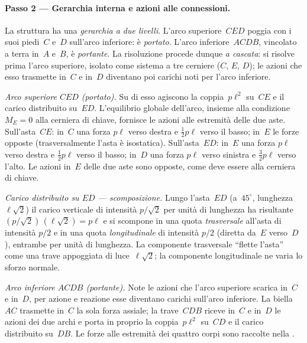 \paragraph{Passo 2 --- Gerarchia interna e azioni
	alle connessioni.}

La struttura ha una \emph{gerarchia a due livelli}.
L'arco superiore~$CED$ poggia con i suoi piedi~$C$ e~$D$
sull'arco inferiore: è \emph{portato}. L'arco
inferiore~$ACDB$, vincolato a terra in~$A$ e~$B$, è
\emph{portante}. La risoluzione procede dunque \emph{a
	cascata}: si risolve prima l'arco superiore, isolato come
sistema a tre cerniere ($C$, $E$, $D$); le azioni che esso
trasmette in~$C$ e in~$D$ diventano poi carichi noti per
l'arco inferiore.

\medskip
\noindent\textit{Arco superiore $CED$ (portato).}
Su di esso agiscono la coppia~$p\ell^2$ su~$CE$ e il carico
distribuito su~$ED$. L'equilibrio globale dell'arco, insieme
alla condizione $M_E = 0$ alla cerniera di chiave, fornisce
le azioni alle estremità delle due aste. Sull'asta~$CE$:
in~$C$ una forza $p\ell$ verso destra e $\tfrac12 p\ell$
verso il basso; in~$E$ le forze opposte (trasversalmente
l'asta è isostatica). Sull'asta~$ED$: in~$E$ una forza
$p\ell$ verso destra e $\tfrac12 p\ell$ verso il basso;
in~$D$ una forza $p\ell$ verso sinistra e $\tfrac32 p\ell$
verso l'alto. Le azioni in~$E$ delle due aste sono opposte,
come deve essere alla cerniera di chiave.

\medskip
\noindent\textit{Carico distribuito su $ED$ --- scomposizione.}
Lungo l'asta~$ED$ (a~$45^\circ$, lunghezza~$\ell\sqrt2$) il
carico verticale di intensità $p/\!\sqrt2$ per unità di
lunghezza ha risultante $(p/\!\sqrt2)\,(\ell\sqrt2) = p\ell$
e si scompone in una quota \emph{trasversale} all'asta di
intensità $p/2$ e in una quota \emph{longitudinale} di
intensità $p/2$ (diretta da~$E$ verso~$D$), entrambe per
unità di lunghezza. La componente trasversale ``flette
l'asta'' come una trave appoggiata di luce~$\ell\sqrt2$; la
componente longitudinale ne varia lo sforzo normale.

\medskip
\noindent\textit{Arco inferiore $ACDB$ (portante).}
Note le azioni che l'arco superiore scarica in~$C$ e in~$D$,
per azione e reazione esse diventano carichi sull'arco
inferiore. La biella~$AC$ trasmette in~$C$ la sola forza
assiale; la trave~$CDB$ riceve in~$C$ e in~$D$ le azioni
dei due archi e porta in proprio la coppia~$p\ell^2$ su~$CD$
e il carico distribuito su~$DB$. Le forze alle estremità dei
quattro corpi sono raccolte nella
.


